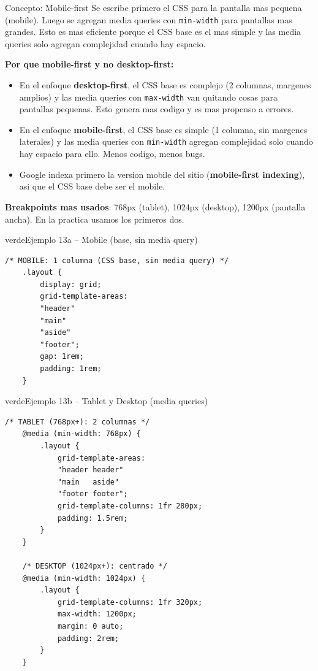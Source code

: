 \documentclass[11pt,a4paper]{article}
\begin{document}
	\begin{cajaconcepto}{Concepto: Mobile-first}
		Se escribe primero el CSS para la pantalla mas pequena (mobile). Luego se agregan media queries con \texttt{min-width} para pantallas mas grandes. Esto es mas eficiente porque el CSS base es el mas simple y las media queries solo agregan complejidad cuando hay espacio.
		
		\textbf{Por que mobile-first y no desktop-first:}
		\begin{itemize}[leftmargin=1.2em,itemsep=3pt]
			\item En el enfoque \textbf{desktop-first}, el CSS base es complejo (2 columnas, margenes amplios) y las media queries con \texttt{max-width} van quitando cosas para pantallas pequenas. Esto genera mas codigo y es mas propenso a errores.
			\item En el enfoque \textbf{mobile-first}, el CSS base es simple (1 columna, sin margenes laterales) y las media queries con \texttt{min-width} agregan complejidad solo cuando hay espacio para ello. Menos codigo, menos bugs.
			\item Google indexa primero la version mobile del sitio (\textbf{mobile-first indexing}), asi que el CSS base debe ser el mobile.
		\end{itemize}
		
		\textbf{Breakpoints mas usados}: 768px (tablet), 1024px (desktop), 1200px (pantalla ancha). En la practica usamos los primeros dos.
	\end{cajaconcepto}
	
	\begin{cajacodigo}{verde}{Ejemplo 13a -- Mobile (base, sin media query)}
		\begin{lstlisting}[style=codecss]
	/* MOBILE: 1 columna (CSS base, sin media query) */
	.layout {
		display: grid;
		grid-template-areas:
		"header"
		"main"
		"aside"
		"footer";
		gap: 1rem;
		padding: 1rem;
	} \end{lstlisting}
	\end{cajacodigo}
	
	\begin{cajacodigo}{verde}{Ejemplo 13b -- Tablet y Desktop (media queries)}
		\begin{lstlisting}[style=codecss]
	/* TABLET (768px+): 2 columnas */
	@media (min-width: 768px) {
		.layout {
			grid-template-areas:
			"header header"
			"main   aside"
			"footer footer";
			grid-template-columns: 1fr 280px;
			padding: 1.5rem;
		}
	}
	
	/* DESKTOP (1024px+): centrado */
	@media (min-width: 1024px) {
		.layout {
			grid-template-columns: 1fr 320px;
			max-width: 1200px;
			margin: 0 auto;
			padding: 2rem;
		}
	} \end{lstlisting}
	\end{cajacodigo}
	
\end{document}
